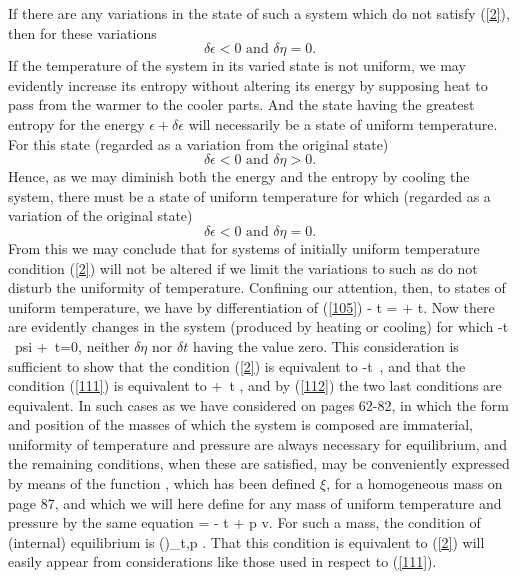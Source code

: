 \documentclass[12pt]{article}
\begin{document}
If there are any variations in the state of such a system which do
not satisfy (\ref{2}), then for these variations
$$\delta \epsilon < 0 \text{  and  } \delta \eta = 0.$$
If the temperature of the system in its varied state is not uniform, we may evidently increase its entropy without altering its energy by supposing heat to pass from the warmer to the cooler parts. And the state having the greatest entropy for the energy $\epsilon + \delta \epsilon$ will necessarily  be a state of uniform temperature. For this state (regarded as a variation from the original state)
$$\delta \epsilon < 0 \text{  and  } \delta \eta > 0.$$
Hence, as we may diminish both the energy and the entropy by cooling the system, there must be a state of uniform temperature for which (regarded as a variation of the original state)
$$\delta \epsilon < 0 \text{  and  } \delta \eta = 0.$$
From this we may conclude that for systems of initially uniform temperature condition (\ref{2}) will not be altered if we limit the variations to such as do not disturb the uniformity of temperature.
Confining our attention, then, to states of uniform temperature, we
have by differentiation of (\ref{105})
\eqs \delta \epsilon- t \delta \eta = \delta \psi + \eta \delta t.              \label{112}\eqe
Now there are evidently changes in the system (produced by heating or cooling) for which
\eqs \delta \epsilon -t \,\delta {} \delta psi + \eta \,\delta t=0,         \label{113}\eqe
neither $\delta \eta$ nor $\delta t$ having the value zero. This consideration is sufficient to show that the condition (\ref{2}) is equivalent to
\eqs \delta \epsilon -t \,\delta \eta {},                      \label{114}\eqe
and that the condition (\ref{111}) is equivalent to
\eqs \delta \psi + \eta \,\delta t ,                      \label{115}\eqe
and by (\ref{112}) the two last conditions are equivalent.
In such cases as we have considered on pages 62-82, in which the form and position of the masses of which the system is composed are immaterial, uniformity of temperature and pressure are always necessary for equilibrium, and the remaining conditions, when these are satisfied, may be conveniently expressed by means of the function , which has been defined $\xi$, for a homogeneous mass on page 87, and which we will here define for any mass of uniform temperature and pressure by the same equation
\eqs \xi = \epsilon - t \eta + p v.  \label{116}\eqe
For such a mass, the condition of (internal) equilibrium is
\eqs (\delta \xi)_{t,p} .  \label{117}\eqe
That this condition is equivalent to (\ref{2}) will easily appear from considerations like those used in respect to (\ref{111}).
\end{document}
